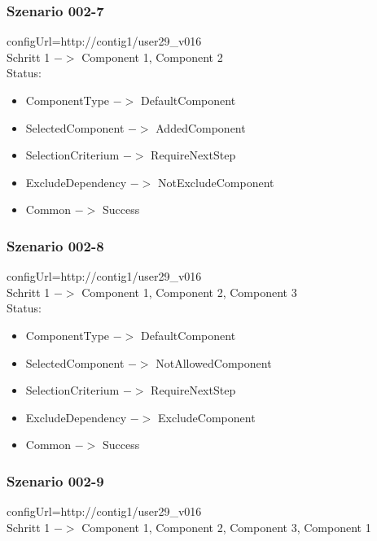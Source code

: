 \documentclass{article}
\begin{document}
\subsubsection{Szenario 002-7}

configUrl=http://contig1/user29\_v016\\

\noindent Schritt 1 $->$ Component 1, Component 2\\

\noindent Status:

\begin{itemize}
  \item ComponentType $->$ DefaultComponent
  \item SelectedComponent $->$ AddedComponent
  \item SelectionCriterium $->$ RequireNextStep
  \item ExcludeDependency $->$ NotExcludeComponent
  \item Common $->$ Success
\end{itemize}

\subsubsection{Szenario 002-8}

configUrl=http://contig1/user29\_v016\\

\noindent Schritt 1 $->$ Component 1, Component 2, Component 3\\

\noindent Status:

\begin{itemize}
  \item ComponentType $->$ DefaultComponent
  \item SelectedComponent $->$ NotAllowedComponent
  \item SelectionCriterium $->$ RequireNextStep
  \item ExcludeDependency $->$ ExcludeComponent
  \item Common $->$ Success
\end{itemize}

\subsubsection{Szenario 002-9}

configUrl=http://contig1/user29\_v016\\

\noindent Schritt 1 $->$ Component 1, Component 2, Component 3, Component 1\\
\end{document}

